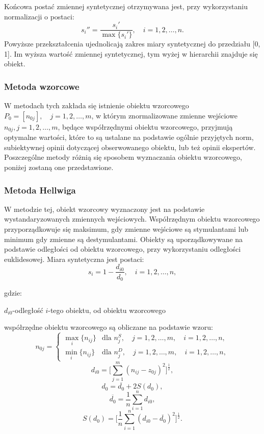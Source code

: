 \documentclass[12pt,a4paper]{report}
\begin{document}
Końcowa postać zmiennej syntetycznej otrzymywana jest, przy wykorzystaniu normalizacji o postaci: %
$$
s_{i}''=\frac{s_{i}'}{\max\{s_{i}'\}},\quad i=1, 2, \ldots, n.
$$
Powyższe przekształcenia ujednolicają zakres miary syntetycznej do przedziału [0, 1]. Im wyższa wartość zmiennej syntetycznej, tym wyżej w hierarchii znajduje się obiekt.%


\subsubsection{Metoda wzorcowe}


W metodach tych zakłada się istnienie obiektu wzorcowego $P_{0}=[n_{0j}], \quad  j= 1,2,\ldots,m$, w którym znormalizowane zmienne wejściowe $n_{0j},  j= 1,2,\ldots,m$, będące współrzędnymi obiektu wzorcowego, przyjmują optymalne wartości, które to są ustalane na podstawie ogólnie przyjętych norm, subiektywnej opinii dotyczącej obserwowanego obiektu, lub też opinii ekspertów. Poszczególne metody różnią się sposobem wyznaczania obiektu wzorcowego, poniżej zostaną one przedstawione.

\subsubsection{Metoda Hellwiga}


W metodzie tej, obiekt wzorcowy wyznaczony jest na podstawie wystandaryzowanych zmiennych wejściowych. Współrzędnym obiektu wzorcowego przyporządkowuje się maksimum, gdy zmienne wejściowe są stymulantami lub minimum gdy zmienne są destymulantami. Obiekty są uporządkowywane na podstawie odległości od obiektu wzorcowego, przy wykorzystaniu odległości euklidesowej.
Miara syntetyczna jest postaci: 
$$
s_i=1-\frac{d_{i0}}{d_{0}},\quad i=1, 2, \ldots, n ,
$$

gdzie:

$d_{i0}$-odległość $i$-tego obiektu, od obiektu wzorcowego

współrzędne obiektu wzorcowego są obliczane na podstawie wzoru:
$$n_{0j}=\left\{ \begin{array}{ll}
\max\limits_{i} \{n_{ij}\} & \textrm{dla  } n_{j}^S,\quad j=1,2,\dots,m, \quad i=1,2,\dots,n, \\
\min\limits_{i} \{n_{ij}\} & \textrm{dla } n_{j}^D, \quad j=1,2,\dots,m, \quad i=1,2,\dots,n,
\end{array} \right. $$
$$d_{i0}=\bigg[\sum_{j=1}^{m} (n_{ij} - z_{0j})^2 \bigg]^\frac{1}{2} ,$$ 
$$d_{0}=\overline{d_{0}} + 2S(d_{0}) ,$$
$$\overline{d_{0}}=\frac{1}{n}\sum_{i=1}^{n} d_{i0} ,$$
$$S(d_{0})=\bigg[\frac{1}{n}\sum_{i=1}^{n} (d_{i0}-\overline{d_{0}})^2 \bigg]^\frac{1}{2} .$$
\end{document}
